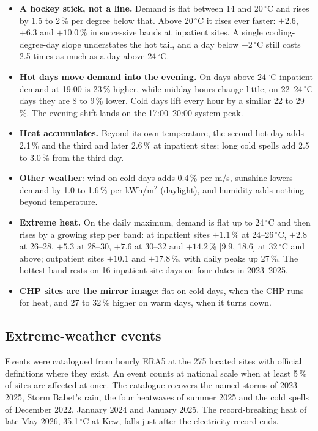 \documentclass[10pt,a4paper]{article}
\begin{document}
\begin{itemize}
\item \textbf{A hockey stick, not a line.} Demand is flat between 14 and 20\,$^\circ$C and rises by 1.5 to 2\,\% per degree below that. Above 20\,$^\circ$C it rises ever faster: $+2.6$, $+6.3$ and $+10.0$\,\% in successive bands at inpatient sites. A single cooling-degree-day slope understates the hot tail, and a day below $-2$\,$^\circ$C still costs 2.5 times as much as a day above 24\,$^\circ$C.
\item \textbf{Hot days move demand into the evening.} On days above 24\,$^\circ$C inpatient demand at 19:00 is 23\,\% higher, while midday hours change little; on 22--24\,$^\circ$C days they are 8 to 9\,\% lower. Cold days lift every hour by a similar 22 to 29\,\%. The evening shift lands on the 17:00--20:00 system peak.
\item \textbf{Heat accumulates.} Beyond its own temperature, the second hot day adds 2.1\,\% and the third and later 2.6\,\% at inpatient sites; long cold spells add 2.5 to 3.0\,\% from the third day.
\item \textbf{Other weather}: wind on cold days adds 0.4\,\% per m/s, sunshine lowers demand by 1.0 to 1.6\,\% per kWh/m$^2$ (daylight), and humidity adds nothing beyond temperature.
\item \textbf{Extreme heat.} On the daily maximum, demand is flat up to 24\,$^\circ$C and then rises by a growing step per band: at inpatient sites $+1.1$\,\% at 24--26\,$^\circ$C, $+2.8$ at 26--28, $+5.3$ at 28--30, $+7.6$ at 30--32 and $+14.2$\,\% [9.9, 18.6] at 32\,$^\circ$C and above; outpatient sites $+10.1$ and $+17.8$\,\%, with daily peaks up 27\,\%. The hottest band rests on 16 inpatient site-days on four dates in 2023--2025.
\item \textbf{CHP sites are the mirror image}: flat on cold days, when the CHP runs for heat, and 27 to 32\,\% higher on warm days, when it turns down.
\end{itemize}

\subsection{Extreme-weather events}
Events were catalogued from hourly ERA5 at the 275 located sites with official definitions where they exist. An event counts at national scale when at least 5\,\% of sites are affected at once. The catalogue recovers the named storms of 2023--2025, Storm Babet's rain, the four heatwaves of summer 2025 and the cold spells of December 2022, January 2024 and January 2025. The record-breaking heat of late May 2026, 35.1\,$^\circ$C at Kew, falls just after the electricity record ends.
\end{document}
